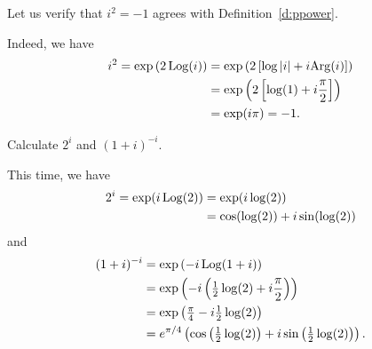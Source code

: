 \begin{example}
 Let us verify that $i^2=-1$ agrees with Definition~\ref{d:ppower}.
\end{example}
\begin{solution}
Indeed, we have
\begin{align*}
i^2 = \exp \left( 2 \operatorname{Log} (i) \right) & = \exp \left( 2 \left[ \log \left| i \right|+i \mathrm{Arg}(i) \right] \right) \\
& = \exp \left( 2 \left[ \log(1)+i \frac{\pi}{2} \right] \right) \\
& = \exp(i\pi) = -1.
\end{align*}
\end{solution}



\begin{example}
Calculate $2^i$ and $(1+i)^{-i}$.
\end{example}
\begin{solution}
This time, we have
\begin{align*}
2^i = \exp(i \operatorname{Log}(2) ) & = \exp(i \log (2) ) \\
& = \cos(\log(2))+i \sin(\log(2))
\end{align*}
and
\begin{align*}
(1+i)^{-i} & = \exp \left( -i \operatorname{Log} (1+i) \right) \\
& = \exp \left( -i\left( \tfrac{1}{2}\log(2)+i\frac{\pi}{2} \right) \right) \\
& = \exp \left( \tfrac{\pi}{4}-i\tfrac{1}{2}\log(2) \right) \\
& = e^{\pi/4} \left( \cos \left( \tfrac{1}{2}\log(2) \right) + i \sin \left( \tfrac{1}{2}\log(2) \right) \right).
\end{align*}
\end{solution}




